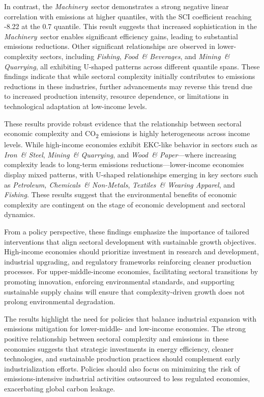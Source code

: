 \documentclass[10pt]{article}
\newcommand{\FI}{\textit{Fishing}}
\newcommand{\FO}{\textit{Food~\& Beverages}}
\newcommand{\IR}{\textit{Iron~\& Steel}}
\newcommand{\MA}{\textit{Machinery}}
\newcommand{\MI}{\textit{Mining~\& Quarrying}}
\newcommand{\PE}{\textit{Petroleum, Chemicals~\& Non-Metals}}
\newcommand{\TE}{\textit{Textiles~\& Wearing Apparel}}
\newcommand{\WO}{\textit{Wood~\& Paper}}
\begin{document}
In contrast, the \MA\ sector demonstrates a strong negative linear correlation with emissions at higher quantiles, with the SCI coefficient reaching -8.22 at the 0.7 quantile. This result suggests that increased sophistication in the \MA\ sector enables significant efficiency gains, leading to substantial emissions reductions. Other significant relationships are observed in lower-complexity sectors, including \FI, \FO, and \MI, all exhibiting U-shaped patterns across different quantile spans. These findings indicate that while sectoral complexity initially contributes to emissions reductions in these industries, further advancements may reverse this trend due to increased production intensity, resource dependence, or limitations in technological adaptation at low-income levels. 

These results provide robust evidence that the relationship between sectoral economic complexity and CO\textsubscript{2} emissions is highly heterogeneous across income levels. While high-income economies exhibit EKC-like behavior in sectors such as \IR, \MI, and \WO—where increasing complexity leads to long-term emissions reductions—lower-income economies display mixed patterns, with U-shaped relationships emerging in key sectors such as \PE, \TE, and \FI. These results suggest that the environmental benefits of economic complexity are contingent on the stage of economic development and sectoral dynamics.

From a policy perspective, these findings emphasize the importance of tailored interventions that align sectoral development with sustainable growth objectives. High-income economies should prioritize investment in research and development, industrial upgrading, and regulatory frameworks reinforcing cleaner production processes. For upper-middle-income economies, facilitating sectoral transitions by promoting innovation, enforcing environmental standards, and supporting sustainable supply chains will ensure that complexity-driven growth does not prolong environmental degradation.

The results highlight the need for policies that balance industrial expansion with emissions mitigation for lower-middle- and low-income economies. The strong positive relationship between sectoral complexity and emissions in these economies suggests that strategic investments in energy efficiency, cleaner technologies, and sustainable production practices should complement early industrialization efforts. Policies should also focus on minimizing the risk of emissions-intensive industrial activities outsourced to less regulated economies, exacerbating global carbon leakage.
\end{document}

